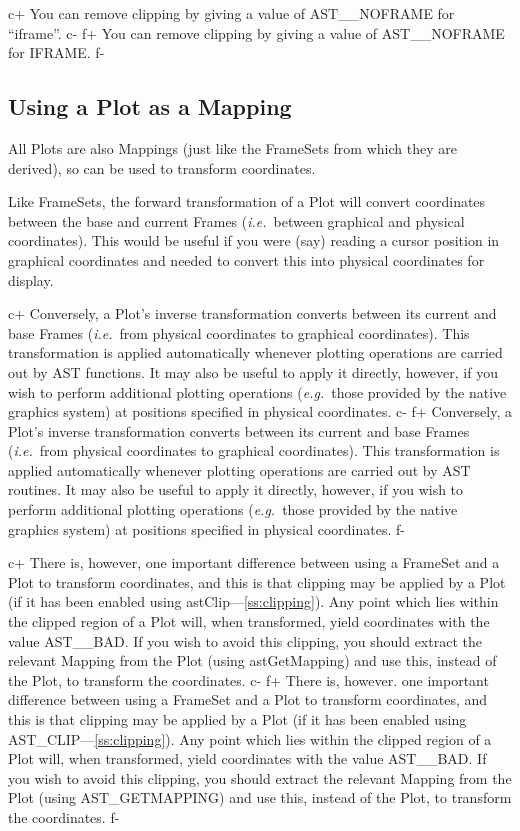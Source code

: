 \documentclass[twoside,11pt]{article}
\newcommand{\secref}[1]{\S\ref{#1}}
\renewcommand{\secref}[1]{\ref{#1}}
\begin{document}
c+
You can remove clipping by giving a value of AST\_\_NOFRAME for ``iframe''.
c-
f+
You can remove clipping by giving a value of AST\_\_NOFRAME for IFRAME.
f-

\subsection{Using a Plot as a Mapping}

All Plots are also Mappings (just like the FrameSets from which they
are derived), so can be used to transform coordinates.

Like FrameSets, the forward transformation of a Plot will convert
coordinates between the base and current Frames ({\em{i.e.}}\ between
graphical and physical coordinates). This would be useful if you were
(say) reading a cursor position in graphical coordinates and needed to
convert this into physical coordinates for display.

c+
Conversely, a Plot's inverse transformation converts between its
current and base Frames ({\em{i.e.}}\ from physical coordinates to
graphical coordinates). This transformation is applied automatically
whenever plotting operations are carried out by AST functions. It may
also be useful to apply it directly, however, if you wish to perform
additional plotting operations ({\em{e.g.}}\ those provided by the
native graphics system) at positions specified in physical
coordinates.
c-
f+
Conversely, a Plot's inverse transformation converts between its
current and base Frames ({\em{i.e.}}\ from physical coordinates to
graphical coordinates). This transformation is applied automatically
whenever plotting operations are carried out by AST routines. It may
also be useful to apply it directly, however, if you wish to perform
additional plotting operations ({\em{e.g.}}\ those provided by the
native graphics system) at positions specified in physical
coordinates.
f-

c+
There is, however, one important difference between using a FrameSet
and a Plot to transform coordinates, and this is that clipping may be
applied by a Plot (if it has been enabled using
astClip---\secref{ss:clipping}). Any point which lies within the
clipped region of a Plot will, when transformed, yield coordinates
with the value AST\_\_BAD. If you wish to avoid this clipping, you
should extract the relevant Mapping from the Plot (using
astGetMapping) and use this, instead of the Plot, to transform the
coordinates.
c-
f+
There is, however. one important difference between using a FrameSet
and a Plot to transform coordinates, and this is that clipping may be
applied by a Plot (if it has been enabled using
AST\_CLIP---\secref{ss:clipping}). Any point which lies within the
clipped region of a Plot will, when transformed, yield coordinates
with the value AST\_\_BAD. If you wish to avoid this clipping, you
should extract the relevant Mapping from the Plot (using
AST\_GETMAPPING) and use this, instead of the Plot, to transform the
coordinates.
f-
\end{document}
